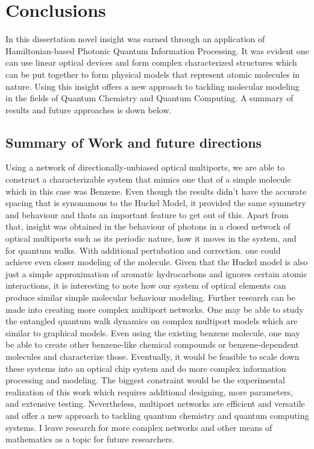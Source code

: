 \chapter{Conclusions}
\label{chapter:Conclusions}
\thispagestyle{myheadings}
In this dissertation novel insight was earned through an application of Hamiltonian-based Photonic Quantum Information Processing. It was evident one can use linear optical devices and form complex characterized structures which can be put together to form physical models that represent atomic molecules in nature. Using this insight offers a new approach to tackling molecular modeling in the fields of Quantum Chemistry and Quantum Computing. A summary of results and future approaches is down below.
\graphicspath{{3_Conclusion/Figures/}}

\section{Summary of Work and future directions}
Using a network of directionally-unbiased optical multiports, we are able to construct a characterizable system that mimics one that of a simple molecule which in this case was Benzene. Even though the results didn't have the accurate spacing that is synonamous to the Huckel Model, it provided the same symmetry and behaviour and thats an important feature to get out of this. Apart from that, insight was obtained in the behaviour of photons in a closed network of optical multiports such as its periodic nature, how it moves in the system, and for quantum walks. With additional pertubation and correction. one could achieve even closer modeling of the molecule. Given that the Huckel model is also just a simple approximation of aromatic hydrocarbons and ignores certain atomic interactions, it is interesting to note how our system of optical elements can produce similar simple molecular behaviour modeling. \newline
Further research can be made into creating more complex multiport networks. One may be able to study the entangled quantum walk dynamics on complex multiport models which are similar to graphical models. Even using the existing benzene molecule, one may be able to create other benzene-like chemical compounds or benzene-dependent molecules and characterize those. Eventually, it would be feasible to scale down these systems into an optical chip system and do more complex information processing and modeling. The biggest constraint would be the experimental realization of this work which requires additional designing, more parameters, and extensive testing. Nevertheless, multiport networks are efficient and versatile and offer a new approach to tackling quantum chemistry and quantum computing systems. I leave research for more complex networks and other means of mathematics as a topic for future researchers. 
